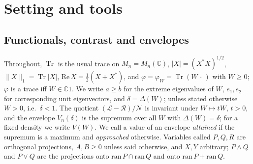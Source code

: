 \documentclass[11pt]{article}
\DeclareMathOperator{\Tr}{Tr}
\newcommand{\C}{\mathbb{C}}
\newcommand{\cL}{\mathcal{L}}
\newcommand{\cR}{\mathcal{R}}
\newcommand{\cN}{\mathcal{N}}
\renewcommand{\Re}{\mathrm{Re}\,}
\theoremstyle{plain}
\theoremstyle{definition}
\theoremstyle{remark}
\begin{document}
\section{Setting and tools}\label{sec:setting}

\subsection{Functionals, contrast and envelopes}
Throughout, $\Tr$ is the usual trace on $M_n=M_n(\C)$, $|X|=(X^*X)^{1/2}$, $\|X\|_1=\Tr|X|$, $\Re X=\frac12(X+X^*)$,
and $\varphi=\varphi_W=\Tr(W\,\cdot\,)$ with $W\ge0$; $\varphi$ is a trace iff $W\in\C1$. We write $a\ge b$ for the
extreme eigenvalues of $W$, $e_1,e_2$ for corresponding unit eigenvectors, and $\delta=\Delta(W)$; unless stated
otherwise $W>0$, i.e.\ $\delta<1$. The quotient $(\cL-\cR)/\cN$ is invariant under $W\mapsto tW$, $t>0$, and the envelope
$V_n(\delta)$ is the supremum over all $W$ with $\Delta(W)=\delta$; for a fixed density we write $V(W)$. We call a
value of an envelope \emph{attained} if the supremum is a maximum and \emph{approached} otherwise. Variables called $P,Q,R$
are orthogonal projections, $A,B\ge0$ unless said otherwise, and $X,Y$ arbitrary; $P\wedge Q$ and $P\vee Q$ are the
projections onto $\mathrm{ran}\,P\cap\mathrm{ran}\,Q$ and onto $\mathrm{ran}\,P+\mathrm{ran}\,Q$.
\end{document}
